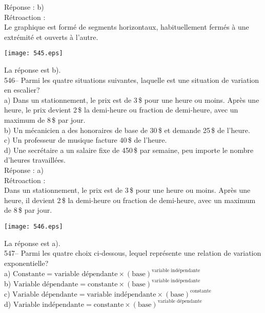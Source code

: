 ﻿\documentclass[letterpaper, 12pt]{article}
\begin{document}
R\'eponse : b)\\

R\'etroaction : \\
Le graphique est form\'e de segments horizontaux, habituellement ferm\'es
\`a une extr\'emit\'e et ouverts \`a l'autre.
   \begin{center}
    \texttt{[image: 545.eps]}
    \end{center}
La r\'eponse est b).\\

546-- Parmi les quatre situations suivantes, laquelle est une situation de
variation en escalier?\\
a) Dans un stationnement, le prix est de 3\,\$ pour une heure ou moins.
Apr\`es une heure, le prix devient 2\,\$ la demi-heure ou fraction de
demi-heure, avec un maximum de 8\,\$ par jour.  \\
b) Un m\'ecanicien a des honoraires de base de 30\,\$ et demande 25\,\$ de
l'heure.\\
c) Un professeur de musique facture 40\,\$ de l'heure.\\
d) Une secr\'etaire a un salaire fixe de 450\,\$ par semaine, peu importe le
nombre d'heures travaill\'ees.\\

R\'eponse : a) \\

R\'etroaction : \\
Dans un stationnement, le prix est de 3\,\$ pour une heure ou moins.
Apr\`es une heure, il devient 2\,\$ la demi-heure ou fraction de demi-heure,
avec un maximum de 8\,\$ par jour.
   \begin{center}
    \texttt{[image: 546.eps]}
    \end{center}
La r\'eponse est a).\\

547-- Parmi les quatre choix ci-dessous, lequel repr\'esente une relation de
variation exponentielle?\\[2mm]
a) $\textrm{Constante}=\textrm{variable
d\'ependante}\times\left(\textrm{base}\right) ^{\textrm{variable
ind\'ependante}}$\\[2mm]
b) $\textrm{Variable
d\'ependante}=\textrm{constante}\times\left(\textrm{base}\right)
^{\textrm{variable ind\'ependante}}$\\[2mm]
c) $\textrm{Variable
d\'ependante}=\textrm{variable
ind\'ependante}\times\left(\textrm{base}\right)
^{\textrm{constante}}$\\ [2mm]
d) $\textrm{Variable
ind\'ependante}=\textrm{constante}\times\left(\textrm{base}\right)
^{\textrm{variable d\'ependante}}$\\
\end{document}
